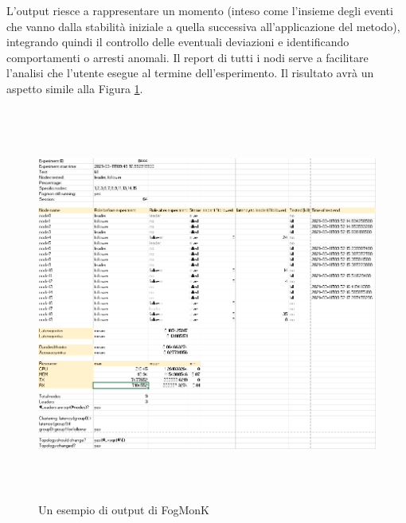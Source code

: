         L'output riesce a rappresentare un momento (inteso come l'insieme degli eventi che vanno dalla stabilità iniziale a quella successiva all'applicazione del metodo), integrando quindi il controllo delle eventuali deviazioni e identificando comportamenti o arresti anomali. Il report di tutti i nodi serve a facilitare l'analisi che l'utente esegue al termine dell'esperimento. Il risultato avrà un aspetto simile alla Figura \ref{fig:output}.
        \begin{figure}
            \begin{center}
                \includegraphics[width=13cm, height=13cm]{images/out.png}
                \caption {Un esempio di output di FogMonK}
                \label{fig:output}
            \end{center}
        \end{figure}

